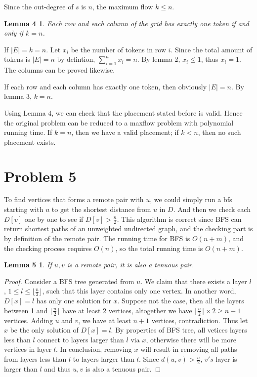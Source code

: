 \documentclass{report}
\def\floor#1{\lfloor{} #1 \rfloor{}}
\begin{document}
    Since the out-degree of $s$ is $n$, the maximum flow $k \le n$.
    \newtheorem*{l4}{Lemma 4}
    \begin{l4}
        Each row and each column of the grid has exactly one token if and only if $k = n$.
    \end{l4}
    If $|E| = k = n$. Let $x_i$ be the number of tokens in row $i$. Since the total amount
    of tokens is $|E| = n$ by defintion, $\sum_{i=1}^n x_i = n$. By lemma 2, $x_i \le 1$,
    thus $x_i = 1$. The columns can be proved likewise.

    If each row and each column has exactly one token, then obviously $|E| = n$. By lemma 3,
    $k = n$. 

    Using Lemma 4, we can check that the placement stated before is valid. Hence the 
    original problem can be reduced to a maxflow problem with polynomial running time.
    If $k = n$, then we have a valid placement; if $k < n$, then no such placement exists.

    \section*{Problem 5}
    To find vertices that forms a remote pair with $u$, we could simply run a bfs starting
    with $u$ to get the shortest distance from $u$ in $D$. And then we check each $D[v]$ 
    one by one to see if $D[v] > \frac{n}{2}$. This algorithm is correct since BFS can 
    return shortest paths of an unweighted undirected graph, and the checking part is by 
    definition of the remote pair. The running time for BFS is $O(n+m)$, and the checking 
    process requires $O(n)$, so the total running time is $O(n+m)$.

    \newtheorem*{l5}{Lemma 5}
    \begin{l5}
        If $u, v$ is a remote pair, it is also a tenuous pair.
    \end{l5}

    \begin{proof}
        Consider a BFS tree generated from $u$. We claim that there exists a layer $l$, 
        $1 \le l \le \floor{\frac{n}{2}}$, such that this layer contains only one vertex. 
        In another word, $D[x] = l$ has only one solution for $x$. Suppose not the case,
        then all the layers between 1 and $\floor{\frac{n}{2}}$ have at least 2 vertices, 
        altogether we have $\floor{\frac{n}{2}} \times 2 \ge n-1$ vertices. Adding $u$ and
        $v$, we have at least $n+1$ vertices, contradiction. Thus let $x$ be the only
        solution of $D[x] = l$. By properties of BFS tree, all vetices layers less than $l$ 
        connect to layers larger than $l$ via $x$, otherwise there will be more vertices in 
        layer $l$. In conclusion, removing $x$ will result in removing all paths from 
        layers less than $l$ to layers larger than $l$. Since $d(u, v) > \frac{n}{2}$,
        $v's$ layer is larger than $l$ and thus $u, v$ is also a tenuous pair.
    \end{proof}
\end{document}
